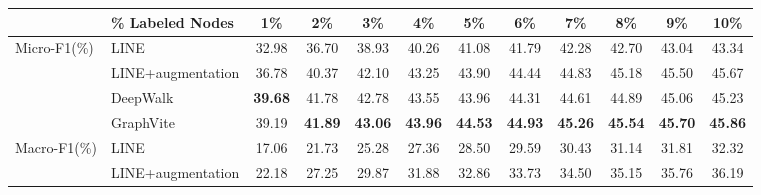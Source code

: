 \documentclass[sigconf]{acmart}
\newcommand{\best}[1]{\textbf{#1}}
\begin{document}
\begin{table*}
    \centering
    \begin{tabular}{llcccccccccc}
        \toprule
                                        & \% Labeled Nodes                      & 1\%           & 2\%           & 3\%           & 4\%           & 5\%
                                                                                & 6\%           & 7\%           & 8\%           & 9\%           & 10\%  \\
        \midrule
        \multirow{4}{*}{Micro-F1(\%)}   & LINE\cite{tang2015line}               & 32.98         & 36.70         & 38.93         & 40.26         & 41.08
                                                                                & 41.79         & 42.28         & 42.70         & 43.04         & 43.34 \\
                                        & LINE\cite{tang2015line}+augmentation  & 36.78         & 40.37         & 42.10         & 43.25         & 43.90
                                                                                & 44.44         & 44.83         & 45.18         & 45.50         & 45.67 \\
                                        & DeepWalk\cite{tang2015line}           & \best{39.68}  & 41.78         & 42.78         & 43.55         & 43.96
                                                                                & 44.31         & 44.61         & 44.89         & 45.06         & 45.23 \\
\cmidrule{2-12}
                                        & GraphVite                             & 39.19         & \best{41.89}  & \best{43.06}  & \best{43.96}  & \best{44.53}
                                                                                & \best{44.93}  & \best{45.26}  & \best{45.54}  & \best{45.70}  & \best{45.86}  \\ \midrule
        \multirow{4}{*}{Macro-F1(\%)}   & LINE\cite{tang2015line}               & 17.06         & 21.73         & 25.28         & 27.36         & 28.50
                                                                                & 29.59         & 30.43         & 31.14         & 31.81         & 32.32 \\
                                        & LINE\cite{tang2015line}+augmentation  & 22.18         & 27.25         & 29.87         & 31.88         & 32.86
                                                                                & 33.73         & 34.50         & 35.15         & 35.76         & 36.19 \\

\end{tabular}
\end{table*}
\end{document}
